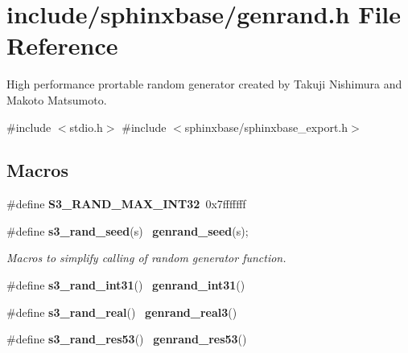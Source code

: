 \section{include/sphinxbase/genrand.h File Reference}
\label{genrand_8h}


High performance prortable random generator created by Takuji Nishimura and Makoto Matsumoto.  


{\ttfamily \#include $<$stdio.\+h$>$}\newline
{\ttfamily \#include $<$sphinxbase/sphinxbase\+\_\+export.\+h$>$}\newline
\subsection*{Macros}
\begin{DoxyCompactItemize}
\item 
\mbox{\label{genrand_8h_a29d6253e4a57e7c4d56cf7f6155b4007}} 
\#define {\bfseries S3\+\_\+\+R\+A\+N\+D\+\_\+\+M\+A\+X\+\_\+\+I\+N\+T32}~0x7fffffff
\item 
\mbox{\label{genrand_8h_a88ed88daecb88e115d8559c1b0a09bb7}} 
\#define \textbf{ s3\+\_\+rand\+\_\+seed}(s)~\textbf{ genrand\+\_\+seed}(s);
\begin{DoxyCompactList}\small\item\em Macros to simplify calling of random generator function. \end{DoxyCompactList}\item 
\mbox{\label{genrand_8h_a3dcc058023a95c0a0ca1f12d1fdec9b9}} 
\#define {\bfseries s3\+\_\+rand\+\_\+int31}()~\textbf{ genrand\+\_\+int31}()
\item 
\mbox{\label{genrand_8h_a85a5844eace98dcbb4742d408a75d5e7}} 
\#define {\bfseries s3\+\_\+rand\+\_\+real}()~\textbf{ genrand\+\_\+real3}()
\item 
\mbox{\label{genrand_8h_a226b9a1deec002aeb1f1775b830a3062}} 
\#define {\bfseries s3\+\_\+rand\+\_\+res53}()~\textbf{ genrand\+\_\+res53}()
\end{DoxyCompactItemize}
